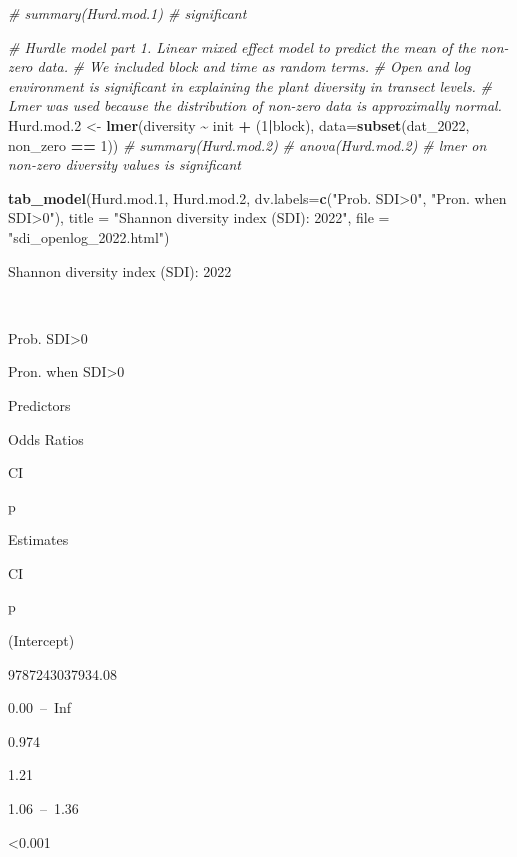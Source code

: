 \documentclass[
]{article}
\newenvironment{Shaded}{\begin{snugshade}}{\end{snugshade}}
\newcommand{\AttributeTok}[1]{\textcolor[rgb]{0.13,0.29,0.53}{#1}}
\newcommand{\CommentTok}[1]{\textcolor[rgb]{0.56,0.35,0.01}{\textit{#1}}}
\newcommand{\DecValTok}[1]{\textcolor[rgb]{0.00,0.00,0.81}{#1}}
\newcommand{\FloatTok}[1]{\textcolor[rgb]{0.00,0.00,0.81}{#1}}
\newcommand{\FunctionTok}[1]{\textcolor[rgb]{0.13,0.29,0.53}{\textbf{#1}}}
\newcommand{\NormalTok}[1]{#1}
\newcommand{\OtherTok}[1]{\textcolor[rgb]{0.56,0.35,0.01}{#1}}
\newcommand{\SpecialCharTok}[1]{\textcolor[rgb]{0.81,0.36,0.00}{\textbf{#1}}}
\newcommand{\StringTok}[1]{\textcolor[rgb]{0.31,0.60,0.02}{#1}}
\begin{document}
\begin{Shaded}
\begin{Highlighting}[]
\CommentTok{\# summary(Hurd.mod.1) \# significant}

\CommentTok{\# Hurdle model part 1. Linear mixed effect model to predict the mean of the non{-}zero data.}
\CommentTok{\# We included block and time as random terms.}
\CommentTok{\# Open and log environment is significant in explaining the plant diversity in transect levels.}
\CommentTok{\# Lmer was used because the distribution of non{-}zero data is approximally normal.}
\NormalTok{Hurd.mod}\FloatTok{.2} \OtherTok{\textless{}{-}} \FunctionTok{lmer}\NormalTok{(diversity }\SpecialCharTok{\textasciitilde{}}\NormalTok{ init }\SpecialCharTok{+}\NormalTok{ (}\DecValTok{1}\SpecialCharTok{|}\NormalTok{block), }\AttributeTok{data=}\FunctionTok{subset}\NormalTok{(dat\_2022, non\_zero }\SpecialCharTok{==} \DecValTok{1}\NormalTok{))}
\CommentTok{\# summary(Hurd.mod.2)}
\CommentTok{\# anova(Hurd.mod.2) \# lmer on non{-}zero diversity values is significant}

\FunctionTok{tab\_model}\NormalTok{(Hurd.mod}\FloatTok{.1}\NormalTok{, Hurd.mod}\FloatTok{.2}\NormalTok{, }\AttributeTok{dv.labels=}\FunctionTok{c}\NormalTok{(}\StringTok{"Prob. SDI\textgreater{}0"}\NormalTok{, }\StringTok{"Pron. when SDI\textgreater{}0"}\NormalTok{), }\AttributeTok{title =} \StringTok{"Shannon diversity index (SDI): 2022"}\NormalTok{, }\AttributeTok{file =} \StringTok{"sdi\_openlog\_2022.html"}\NormalTok{)}
\end{Highlighting}
\end{Shaded}

Shannon diversity index (SDI): 2022

~

Prob. SDI\textgreater0

Pron. when SDI\textgreater0

Predictors

Odds Ratios

CI

p

Estimates

CI

p

(Intercept)

9787243037934.08

0.00~--~Inf

0.974

1.21

1.06~--~1.36

\textless0.001
\end{document}
